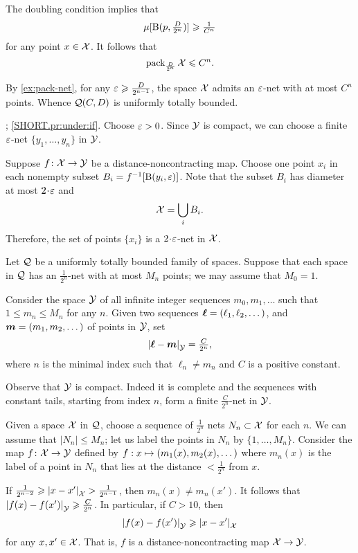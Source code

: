 The doubling condition implies that 
\[\mu[\mathrm{B}{}(p,\tfrac D{2^n})]\geqslant\tfrac 1{C^n}\]
for any point $x\in \mathcal{X}$.
It follows that 
\[\operatorname{\rm pack}\nolimits_{\frac D{2^n}}\mathcal{X}\leqslant C^n.\]

By \ref{ex:pack-net}, for any $\varepsilon\geqslant\frac D{2^{n-1}}$, the space $\mathcal{X}$ admits an $\varepsilon$-net with at most $C^n$ points.
Whence $\mathcal{Q}(C,D)$ is uniformly totally bounded.

\parbf{\ref{pr:under}}; \ref{SHORT.pr:under:if}.
Choose $\varepsilon>0$.
Since $\mathcal{Y}$ is compact, we can choose a finite $\varepsilon$-net $\{y_1,\dots,y_{n}\}$ in $\mathcal{Y}$.

Suppose $f\colon\mathcal{X}\to \mathcal{Y}$ be a distance-noncontracting map.
Choose one point $x_i$ in each nonempty subset $B_i=f^{-1}[\mathrm{B}{}(y_i,\varepsilon)]$.
Note that the subset $B_i$ has diameter at most $2\cdot \eps$ and 
\[\mathcal{X}=\bigcup_iB_i.\]
Therefore, the set of points $\{x_i\}$ is a $2\cdot\eps$-net in $\mathcal{X}$.

 Let $\mathcal{Q}$ be a uniformly totally bounded family of spaces. 
Suppose that each space in $\mathcal{Q}$ has an $\tfrac1{2^n}$-net with at most $M_n$ points; we may assume that $M_0=1$.

Consider the space $\mathcal{Y}$ of all infinite integer sequences $m_0,m_1,\dots$ such that $1\le m_n\le M_n$ for any $n$.
Given two sequences $\bm{\ell}\z=(\ell_1,\ell_2,\dots)$, and $\bm{m}\z=(m_1,m_2,\dots)$ of points in $\mathcal{Y}$, set 
\[\dist{\bm{\ell}}{\bm{m}}{\spc{Y}}=\tfrac C{2^{n}},\]
where $n$ is the minimal index such that $\ell_n\ne m_n$ and $C$ is a positive constant.

Observe that $\mathcal{Y}$ is compact.
Indeed it is complete and the sequences with constant tails, starting from index $n$, form a finite $\tfrac C{2^{n}}$-net in $\mathcal{Y}$.

Given a space $\mathcal{X}$ in $\mathcal{Q}$,
choose a sequence of $\tfrac1{2^n}$ nets 
$N_n\subset\mathcal{X}$ for each $n$.
We can assume that $|N_n|\le M_n$; let us label the points in $N_n$ by $\{1,\dots,M_n\}$.
Consider the map $f\colon\mathcal{X}\to\mathcal{Y}$ defined by $f:x\z\mapsto (m_1(x),m_2(x),\dots)$ where $m_n(x)$ is the label of a point in $N_n$ that lies at the distance $<\tfrac1{2^n}$ from $x$.

If $\tfrac1{2^{n-2}}\ge \dist{x}{x'}{\spc{X}}>\tfrac1{2^{n-1}}$, then $m_n(x)\ne m_n(x')$.
It follows that $\dist{f(x)}{f(x')}{\spc{Y}}\ge \tfrac C{2^{n}}$.
In particular, if $C>10$, then 
\[\dist{f(x)}{f(x')}{\spc{Y}}\ge \dist{x}{x'}{\spc{X}}\]
for any $x,x'\in \mathcal{X}$.
That is, $f$ is a distance-noncontracting map $\mathcal{X}\to \mathcal{Y}$.

